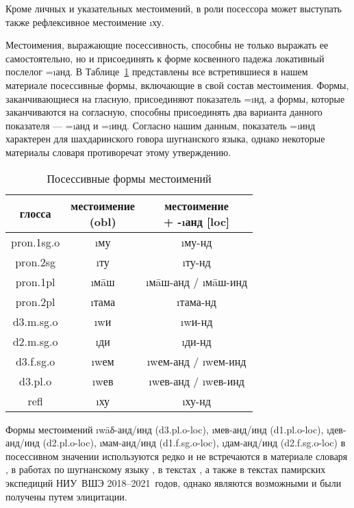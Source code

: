 Кроме личных и указательных местоимений, в роли посессора может выступать также рефлексивное местоимение \i{ху}.

Местоимения, выражающие посессивность, способны не только выражать ее самостоятельно, но и присоединять к форме косвенного падежа локативный послелог =\i{анд}. В Таблице~\ref{tab:poss3} представлены все встретившиеся в нашем материале посессивные формы, включающие в свой состав местоимения. Формы, заканчивающиеся на гласную, присоединяют показатель =\i{нд}, а формы, которые заканчиваются на согласную, способны присоединять два варианта данного показателя — =\i{анд} и =\i{инд}. Согласно нашим данным, показатель =\i{инд} характерен для шахдаринского говора шугнанского языка, однако некоторые материалы словаря \parencite{karamshoev1988} противоречат этому утверждению.

\begin{table}[h]
 \centering
 \caption{Посессивные формы местоимений}
 \smallskip
 \label{tab:poss3}
 \begin{tabular}{c|cc} \toprule
 глосса & \makecell{местоимение\\({\sc obl})} & \makecell{местоимение\\+ -\i{анд} [{\sc loc}]} \\ \midrule
 {\sc pron.1sg.o} & \i{му} & \i{му-нд} \\
 {\sc pron.2sg} & \i{ту} & \i{ту-нд} \\
 {\sc pron.1pl} & \i{мāш} & \i{мāш-анд} / \i{мāш-инд} \\
 {\sc pron.2pl} & \i{тама} & \i{тама-нд} \\
 {\sc d3.m.sg.o} & \i{wи} & \i{wи-нд} \\
 {\sc d2.m.sg.o} & \i{ди} & \i{ди-нд} \\
 {\sc d3.f.sg.o} & \i{wем} & \i{wем-анд} / \i{wем-инд} \\
 {\sc d3.pl.o} & \i{wев} & \i{wев-анд} / \i{wев-инд} \\
 {\sc refl} & \i{ху} & \i{ху-нд} \\ \bottomrule
 \end{tabular}
\end{table}

Формы местоимений \i{wāδ-анд/инд} ({\sc d3.pl.o-loc}), \i{мев-анд/инд} ({\sc d1.pl.o-loc}), \i{дев-анд/инд} ({\sc d2.pl.o-loc}), \i{мам-анд/инд} ({\sc d1.f.sg.o-loc}), \i{дам-анд/инд} ({\sc d2.f.sg.o-loc}) в посессивном значении используются редко и не встречаются в материале словаря \parencite{karamshoev1988}, в работах по шугнанскому языку \parencites{alamshoev1994}{karamshoev1963}{edelman1999_shugrush}{edelman_yusufbekov1999_shughni}{yusufbekov1998}{edelman_dodykhudoeva2009_shughni}, в текстах \parencite{zarubin1960}, а также в текстах памирских экспедиций НИУ~ВШЭ 2018–2021~годов, однако являются возможными и были получены путем элицитации.

